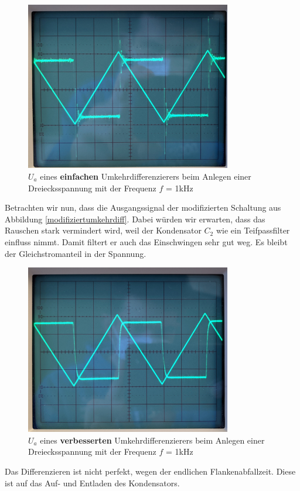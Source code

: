 \begin{figure}[h]
    \centering
    \includegraphics[width = 9cm]{Bilder/43-diffSchwingung.jpg}
    \caption{$U_a$ eines \textbf{einfachen} Umkehrdifferenzierers beim Anlegen einer Dreiecksspannung mit der Frequenz $f$ = 1kHz}
    \label{Einschwingprozess}
\end{figure}
Betrachten wir nun, dass die Ausgangssignal der modifizierten Schaltung aus Abbildung \ref{modifiziertumkehrdiff}. Dabei würden wir erwarten, dass das Rauschen stark vermindert wird, weil der Kondensator $C_2$ wie ein Teifpassfilter einfluss nimmt. Damit filtert er auch das Einschwingen sehr gut weg. Es bleibt der Gleichstromanteil in der Spannung.
\begin{figure}[h]
    \centering
    \includegraphics[width = 9cm]{Bilder/43-diffStabil.jpg}
    \caption{$U_a$ eines \textbf{verbesserten} Umkehrdifferenzierers beim Anlegen einer Dreiecksspannung mit der Frequenz $f$ = 1kHz}
    \label{Einschwingprozess}
\end{figure}
Das Differenzieren ist nicht perfekt, wegen der endlichen Flankenabfallzeit. Diese ist auf das Auf- und Entladen des Kondensators.
\newpage
